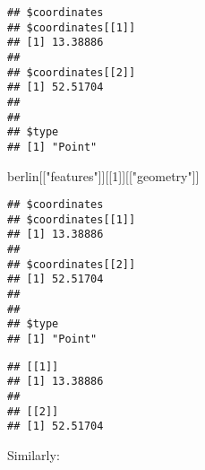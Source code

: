 \documentclass[]{book}
\newenvironment{Shaded}{\begin{snugshade}}{\end{snugshade}}
\newcommand{\DecValTok}[1]{\textcolor[rgb]{0.00,0.00,0.81}{#1}}
\newcommand{\KeywordTok}[1]{\textcolor[rgb]{0.13,0.29,0.53}{\textbf{#1}}}
\newcommand{\NormalTok}[1]{#1}
\newcommand{\OperatorTok}[1]{\textcolor[rgb]{0.81,0.36,0.00}{\textbf{#1}}}
\newcommand{\StringTok}[1]{\textcolor[rgb]{0.31,0.60,0.02}{#1}}
\begin{document}
\begin{Shaded}
\end{Shaded}

\begin{verbatim}
## $coordinates
## $coordinates[[1]]
## [1] 13.38886
## 
## $coordinates[[2]]
## [1] 52.51704
## 
## 
## $type
## [1] "Point"
\end{verbatim}

\begin{Shaded}
\begin{Highlighting}[]
\NormalTok{berlin[[}\StringTok{"features"}\NormalTok{]][[}\DecValTok{1}\NormalTok{]][[}\StringTok{"geometry"}\NormalTok{]]}
\end{Highlighting}
\end{Shaded}

\begin{verbatim}
## $coordinates
## $coordinates[[1]]
## [1] 13.38886
## 
## $coordinates[[2]]
## [1] 52.51704
## 
## 
## $type
## [1] "Point"
\end{verbatim}

\begin{Shaded}
\end{Shaded}

\begin{verbatim}
## [[1]]
## [1] 13.38886
## 
## [[2]]
## [1] 52.51704
\end{verbatim}

Similarly:

\begin{Shaded}
\end{Shaded}
\end{document}
